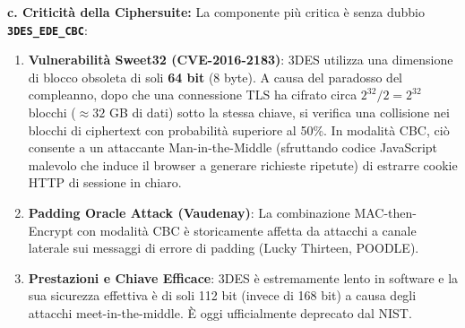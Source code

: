 \documentclass[11pt,a4paper]{article}
\begin{document}
\begin{solutionbox}
\textbf{c. Criticit\`a della Ciphersuite:}
La componente pi\`u critica \`e senza dubbio \textbf{\texttt{3DES\_EDE\_CBC}}:
\begin{enumerate}
    \item \textbf{Vulnerabilit\`a Sweet32 (CVE-2016-2183)}: 3DES utilizza una dimensione di blocco obsoleta di soli \textbf{64 bit} (8 byte). A causa del paradosso del compleanno, dopo che una connessione TLS ha cifrato circa $2^{32}/2 = 2^{32}$ blocchi ($\approx 32$ GB di dati) sotto la stessa chiave, si verifica una collisione nei blocchi di ciphertext con probabilit\`a superiore al 50\%. In modalit\`a CBC, ci\`o consente a un attaccante Man-in-the-Middle (sfruttando codice JavaScript malevolo che induce il browser a generare richieste ripetute) di estrarre cookie HTTP di sessione in chiaro.
    \item \textbf{Padding Oracle Attack (Vaudenay)}: La combinazione MAC-then-Encrypt con modalit\`a CBC \`e storicamente affetta da attacchi a canale laterale sui messaggi di errore di padding (Lucky Thirteen, POODLE).
    \item \textbf{Prestazioni e Chiave Efficace}: 3DES \`e estremamente lento in software e la sua sicurezza effettiva \`e di soli 112 bit (invece di 168 bit) a causa degli attacchi meet-in-the-middle. \`E oggi ufficialmente deprecato dal NIST.
\end{enumerate}
\end{solutionbox}
\end{document}
